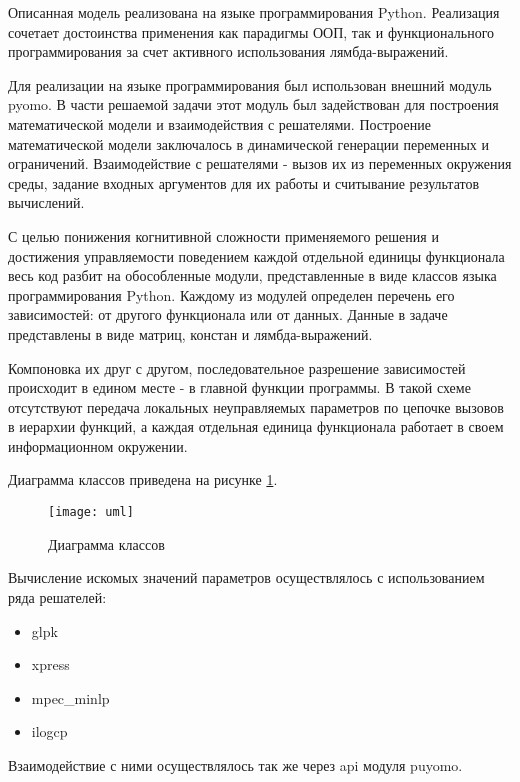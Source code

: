 

Описанная модель реализована на языке программирования Python. Реализация сочетает достоинства применения как парадигмы ООП, так и функционального программирования за счет активного использования лямбда-выражений.

Для реализации на языке программирования был использован внешний модуль pyomo. В части решаемой задачи этот модуль был задействован для построения математической модели и взаимодействия с решателями. Построение математической модели заключалось в динамической генерации переменных и ограничений. Взаимодействие с решателями - вызов их из переменных окружения среды, задание входных аргументов для их работы и считывание результатов вычислений.

С целью понижения когнитивной сложности применяемого решения и достижения управляемости поведением каждой отдельной единицы функционала весь код разбит на обособленные модули, представленные в виде классов языка программирования Python. Каждому из модулей определен перечень его зависимостей: от другого функционала или от данных. Данные в задаче представлены в виде матриц, констан и лямбда-выражений.

Компоновка их друг с другом, последовательное разрешение зависимостей происходит в едином месте - в главной функции программы. В такой схеме отсутствуют передача локальных неуправляемых параметров по цепочке вызовов в иерархии функций, а каждая отдельная единица функционала работает в своем информационном окружении.

Диаграмма классов приведена на рисунке \ref{fig:uml}.

\begin{figure}[H]
    \centering
    \texttt{[image: uml]}
    \caption{Диаграмма классов}
    \label{fig:uml}
\end{figure}

Вычисление искомых значений параметров осуществлялось с использованием ряда решателей:
\begin{itemize}
  \item glpk
  \item xpress
  \item mpec\_minlp
  \item ilogcp
\end{itemize}

Взаимодействие с ними осуществлялось так же через api модуля puyomo.

